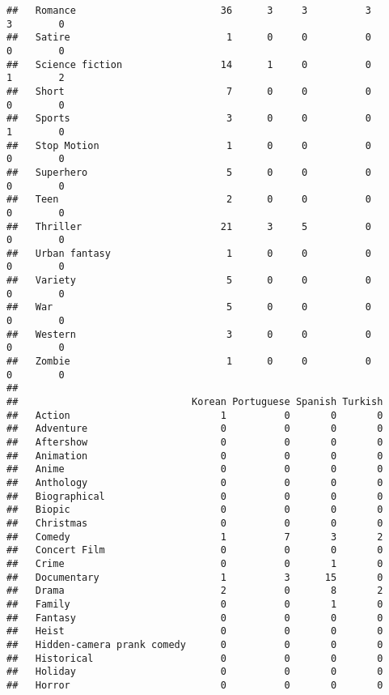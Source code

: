 \documentclass[
]{article}
\begin{document}
\begin{verbatim}
##   Romance                         36      3     3          3       3        0
##   Satire                           1      0     0          0       0        0
##   Science fiction                 14      1     0          0       1        2
##   Short                            7      0     0          0       0        0
##   Sports                           3      0     0          0       1        0
##   Stop Motion                      1      0     0          0       0        0
##   Superhero                        5      0     0          0       0        0
##   Teen                             2      0     0          0       0        0
##   Thriller                        21      3     5          0       0        0
##   Urban fantasy                    1      0     0          0       0        0
##   Variety                          5      0     0          0       0        0
##   War                              5      0     0          0       0        0
##   Western                          3      0     0          0       0        0
##   Zombie                           1      0     0          0       0        0
##                             
##                              Korean Portuguese Spanish Turkish
##   Action                          1          0       0       0
##   Adventure                       0          0       0       0
##   Aftershow                       0          0       0       0
##   Animation                       0          0       0       0
##   Anime                           0          0       0       0
##   Anthology                       0          0       0       0
##   Biographical                    0          0       0       0
##   Biopic                          0          0       0       0
##   Christmas                       0          0       0       0
##   Comedy                          1          7       3       2
##   Concert Film                    0          0       0       0
##   Crime                           0          0       1       0
##   Documentary                     1          3      15       0
##   Drama                           2          0       8       2
##   Family                          0          0       1       0
##   Fantasy                         0          0       0       0
##   Heist                           0          0       0       0
##   Hidden-camera prank comedy      0          0       0       0
##   Historical                      0          0       0       0
##   Holiday                         0          0       0       0
##   Horror                          0          0       0       0

\end{verbatim}
\end{document}
